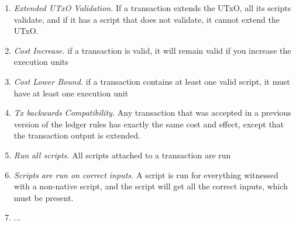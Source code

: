 \begin{enumerate}
\item
  \emph{Extended UTxO Validation.}
  If a transaction extends the UTxO, all its scripts validate, and
  if it has a script that does not validate, it cannot extend the
  UTxO.
\item
  \emph{Cost Increase.} if a transaction is valid, it will remain valid if you increase the execution units
\item
  \emph{Cost Lower Bound.} if a transaction contains at least one valid script, it must have at least one execution unit
\item
  \emph{Tx backwards Compatibility.} Any transaction that was accepted in a previous version of the ledger rules
    has exactly the same cost and effect, except that the transaction output is extended.
\item \emph{Run all scripts.} All scripts attached to a transaction are run
\item \emph{Scripts are run on correct inputs.}
  A script is run for everything witnessed with a non-native script, and the script will
get all the correct inputs, which must be present.
\item
  ... 
\end{enumerate}
